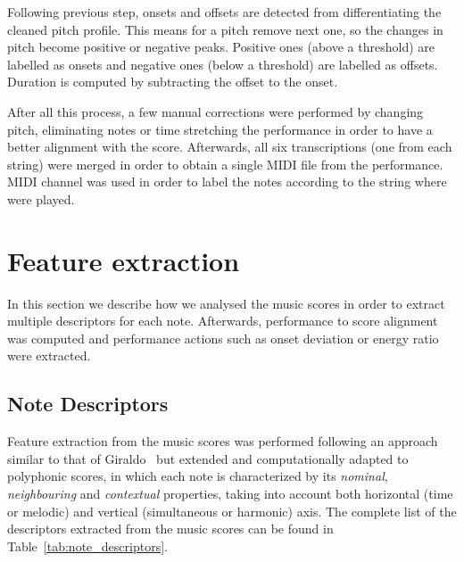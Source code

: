 Following previous step, onsets and offsets are detected from differentiating the cleaned pitch profile. This means for a pitch remove next one, so the changes in pitch become positive or negative peaks. Positive ones (above a threshold) are labelled as onsets and negative ones (below a threshold) are labelled as offsets. Duration is computed by subtracting the offset to the onset.

After all this process, a few manual corrections were performed by changing pitch, eliminating notes or time stretching the performance in order to have a better alignment with the score. Afterwards, all six transcriptions (one from each string) were merged in order to obtain a single MIDI file from the performance. MIDI channel was used in order to label the notes according to the string where were played.

\section{Feature extraction}
In this section we describe how we analysed the music scores in order to extract multiple descriptors for each note. Afterwards, performance to score alignment was computed and performance actions such as onset deviation or energy ratio were extracted.

\subsection{Note Descriptors}
Feature extraction from the music scores was performed following an approach similar to that of Giraldo~\cite{Giraldo2016} but extended and computationally adapted to polyphonic scores, in which each note is characterized by its \textit{nominal}, \textit{neighbouring} and \textit{contextual} properties, taking into account both horizontal (time or melodic) and vertical (simultaneous or harmonic) axis. The complete list of the descriptors extracted from the music scores can be found in Table~\ref{tab:note_descriptors}.



